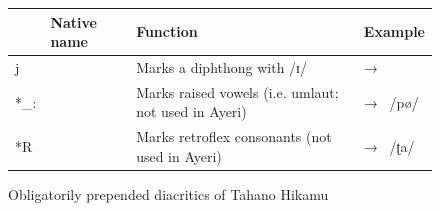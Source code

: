 \begin{figure}[htp]
\caption{Obligatorily prepended diacritics of Tahano Hikamu}
\begin{tabu} to 
\toprule
\tableheaderfont

	& Native name
	& Function
	& Example
	\\
	
\toprule

*j
	& 
	& Marks a diphthong with /ɪ/
	&  → 
	\\
	
\midrule

*\_:
	& 
	& Marks raised vowels (i.e. umlaut; not used in Ayeri)
	&  → ~/pø/
	\\
	
\midrule

*R
	& 
	& Marks retroflex consonants (not used in Ayeri)\footnotemark
	&  → ~/ʈa/
	\\

\bottomrule
\end{tabu}
\label{fig:thdiapreobl}
\end{figure}


